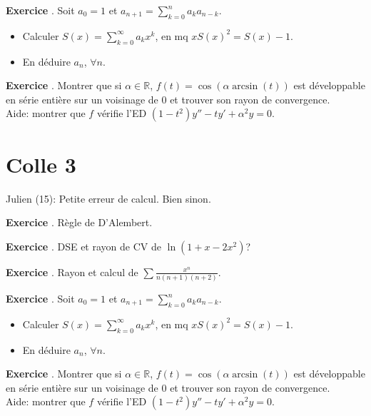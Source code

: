 \documentclass[10pt,a4paper]{article}
\newcounter{question}
\newcounter{exo}
\newenvironment{exo}{\vspace{0.5cm}\setcounter{question}{0}\addtocounter{exo}{1} \noindent \textbf{Exercice \theexo}. \normalsize }{\par}
\begin{document}
	\begin{exo}
		Soit $a_0 = 1$ et $a_{n+1} = \sum_{k=0}^{n} a_k a_{n-k}$.
		\begin{itemize}
			\item Calculer $S(x) = \sum_{k=0}^{\infty} a_k x^k$, en mq $xS(x)^2 = S(x) - 1$.
			\item En déduire $a_n$, $\forall n$.
		\end{itemize}
	\end{exo}

	\begin{exo}
		Montrer que si $\alpha \in \mathbb{R}$, $f(t) =\cos(\alpha \arcsin(t))$ est développable en série entière sur un voisinage de 0 et trouver son rayon de convergence.\\
		Aide: montrer que $f$ vérifie l'ED $(1 - t^2) y'' - t y' + \alpha^2 y = 0$.
	\end{exo}
	
	\section*{Colle 3}
	\setcounter{exo}{0}
	Julien (15): Petite erreur de calcul. Bien sinon.\\
	
	\begin{exo}
		Règle de D'Alembert.
	\end{exo}
	
	\begin{exo}
		DSE et rayon de CV de $\ln(1 + x - 2x^2)$?
	\end{exo}
	\begin{exo}
		Rayon et calcul de $\sum \frac{x^n}{n(n+1)(n+2)}$.
	\end{exo}

	\begin{exo}
		Soit $a_0 = 1$ et $a_{n+1} = \sum_{k=0}^{n} a_k a_{n-k}$.
		\begin{itemize}
			\item Calculer $S(x) = \sum_{k=0}^{\infty} a_k x^k$, en mq $xS(x)^2 = S(x) - 1$.
			\item En déduire $a_n$, $\forall n$.
		\end{itemize}
	\end{exo}

	\begin{exo}
		Montrer que si $\alpha \in \mathbb{R}$, $f(t) =\cos(\alpha \arcsin(t))$ est développable en série entière sur un voisinage de 0 et trouver son rayon de convergence.\\
		Aide: montrer que $f$ vérifie l'ED $(1 - t^2) y'' - t y' + \alpha^2 y = 0$.
	\end{exo}
		
\end{document}
